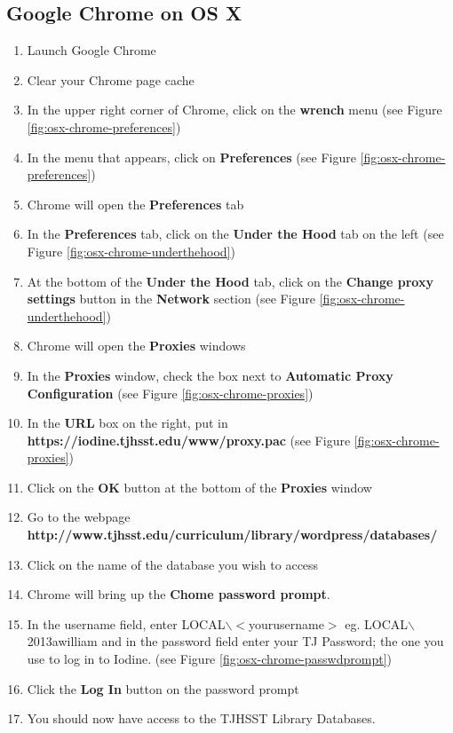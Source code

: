 \documentclass{article}
\newcommand{\proxypacurl}{https://iodine.tjhsst.edu/www/proxy.pac}
\newcommand{\librarydbpage}{http://www.tjhsst.edu/curriculum/library/wordpress/databases/}
\begin{document}
\begin{flushleft}
\section{Google Chrome on OS X}
\begin{enumerate}
\item Launch Google Chrome
\item Clear your Chrome page cache
\item In the upper right corner of Chrome, click on the \textbf{wrench} menu (see Figure \ref{fig:osx-chrome-preferences})
\item In the menu that appears, click on \textbf{Preferences} (see Figure \ref{fig:osx-chrome-preferences})
\item Chrome will open the \textbf{Preferences} tab
\item In the \textbf{Preferences} tab, click on the \textbf{Under the Hood} tab on the left (see Figure \ref{fig:osx-chrome-underthehood})
\item At the bottom of the \textbf{Under the Hood} tab, click on the \textbf{Change proxy settings} button in the \textbf{Network} section (see Figure \ref{fig:osx-chrome-underthehood})
\item Chrome will open the \textbf{Proxies} windows
\item In the \textbf{Proxies} window, check the box next to \textbf{Automatic Proxy Configuration} (see Figure \ref{fig:osx-chrome-proxies})
\item In the \textbf{URL} box on the right, put in \linebreak\textbf{\proxypacurl} (see Figure \ref{fig:osx-chrome-proxies})
\item Click on the \textbf{OK} button at the bottom of the \textbf{Proxies} window
\item Go to the webpage \textbf{\librarydbpage}
\item Click on the name of the database you wish to access
\item Chrome will bring up the \textbf{Chome password prompt}.
\item In the username field, enter LOCAL$\backslash$$<$yourusername$>$ eg. LOCAL$\backslash$2013awilliam and in the password field enter your TJ Password; the one you use to log in to Iodine. (see Figure \ref{fig:osx-chrome-passwdprompt})
\item Click the \textbf{Log In} button on the password prompt
\item You should now have access to the TJHSST Library Databases.
\end{enumerate}

\end{flushleft}
\end{document}
